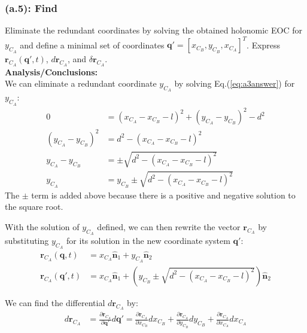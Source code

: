 \documentclass[titlepage]{article}
\begin{document}
\subsubsection*{(a.5): Find}
Eliminate the redundant coordinates by solving the obtained holonomic EOC for $y_{C_A}$ and define a minimal set of coordinates $\boldsymbol{q}'=[x_{C_B}, y_{C_B}, x_{C_A}]^T$. Express $\boldsymbol{r}_{C_A}(\boldsymbol{q}',t)$, $d{\boldsymbol{r}_{C_A}}$, and $\delta\boldsymbol{r}_{C_A}$.\\

\textbf{Analysis/Conclusions:}\\
We can eliminate a redundant coordinate $y_{C_A}$ by solving Eq.(\ref{eq:a3answer}) for $y_{C_A}$:
\begin{equation}
	\begin{split}
		0&=(x_{C_A}-x_{C_B}-l)^2+(y_{C_A}-y_{C_B})^2-d^2 \\
		(y_{C_A}-y_{C_B})^2&=d^2-(x_{C_A}-x_{C_B}-l)^2 \\
		y_{C_A}-y_{C_B}&=\pm\sqrt{d^2-(x_{C_A}-x_{C_B}-l)^2} \\
		y_{C_A}&=y_{C_B}\pm\sqrt{d^2-(x_{C_A}-x_{C_B}-l)^2}
	\end{split}
\end{equation}
The $\pm$ term is added above because there is a positive and negative solution to the square root.\\

\begin{mdframed}[linewidth=1pt, innertopmargin=10pt, innerbottommargin=10pt]
	With the solution of $y_{C_A}$ defined, we can then rewrite the vector $\boldsymbol{r}_{C_A}$ by substituting $y_{C_A}$ for its solution in the new coordinate system $\boldsymbol{q}'$:
	\begin{equation}
		\begin{split}
			\boldsymbol{r}_{C_A}(\boldsymbol{q},t)&=x_{C_A}\hat{\boldsymbol{n}}_1+y_{C_A}\hat{\boldsymbol{n}}_2 \\
			\boldsymbol{r}_{C_A}(\boldsymbol{q}',t)&=x_{C_A}\hat{\boldsymbol{n}}_1+\left(y_{C_B}\pm\sqrt{d^2-(x_{C_A}-x_{C_B}-l)^2}\right)\hat{\boldsymbol{n}}_2
		\end{split}
	\end{equation}
\end{mdframed}

We can find the differential $d\boldsymbol{r}_{C_A}$ by:
\begin{equation}
	\begin{split}
		d\boldsymbol{r}_{C_A}&=\frac{\partial\boldsymbol{r}_{C_A}}{\partial\boldsymbol{q}'} d\boldsymbol{q}'=\frac{\partial\boldsymbol{r}_{C_A}}{\partial x_{C_B} }dx_{C_B}+\frac{\partial\boldsymbol{r}_{C_A}}{\partial y_{C_B}}dy_{C_B}+\frac{\partial\boldsymbol{r}_{C_A}}{\partial x_{C_A}}dx_{C_A} \\
	\end{split}
\end{equation}
\end{document}
